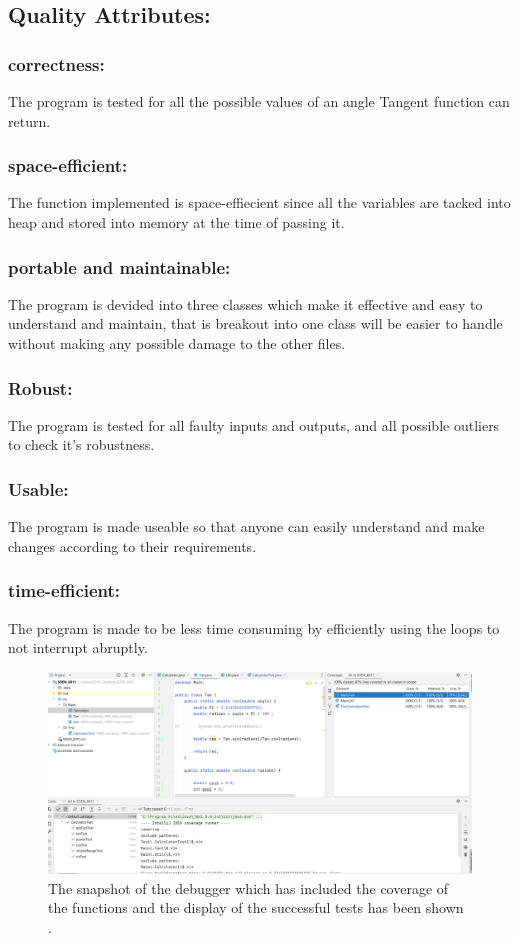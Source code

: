 \documentclass[a4paper, 11pt]{article}
\begin{document}
\subsection{Quality Attributes:}
\subsubsection{ correctness:}
The program is tested for all the possible values of an angle Tangent function can return.
\subsubsection{space-efficient:}
The function implemented is space-effiecient since all the variables are tacked into heap and stored into memory at the time of passing it.
\subsubsection{portable and maintainable:}
The program is devided into three classes which make it effective and easy to understand and maintain, that is breakout into one class will be easier to handle without making any possible damage to the other files.
\subsubsection{Robust:}
The program is tested for all faulty inputs and outputs, and all possible outliers to check it's robustness.
\subsubsection{Usable:}
The program is made useable so that anyone can easily understand and make changes according to their requirements.
\subsubsection{ time-efficient:}
The program is made to be less time consuming by efficiently using the loops to not interrupt abruptly.


\begin{figure}[H]
\includegraphics[width=18cm]{debugger1.png}
\caption{The snapshot of the debugger which has included the coverage of the functions and the display of the successful tests has been shown .}
\label{exp}
\end{figure}
\end{document}

